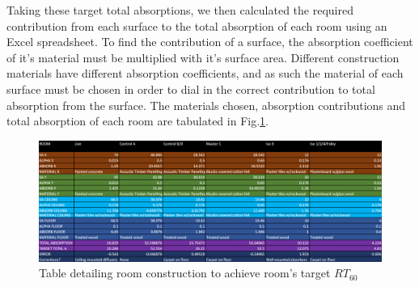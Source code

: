 \documentclass[10pt, twocolumn]{article}
\begin{document}
            Taking these target total absorptions, we then calculated the required contribution from each surface to the total absorption of each room using an Excel spreadsheet.
            To find the contribution of a surface, the absorption coefficient of it's material must be multiplied with it's surface area.
            Different construction materials have different absorption coefficients, and as such the material of each surface must be chosen in order to dial in the correct contribution to total absorption from the surface.
            The materials chosen, absorption contributions and total absorption of each room are tabulated in Fig.\ref{reverb}.
            \begin{figure}
                \includegraphics[scale=0.4]{resources/reverb.png}
                \caption{Table detailing room construction to achieve room's target $RT_{60}$}
                \label{reverb}
                \centering
            \end{figure}
\end{document}
